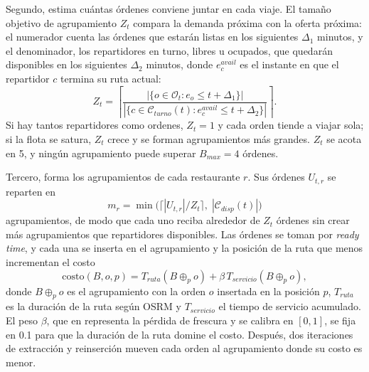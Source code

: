 \documentclass[10pt]{article}
\newcommand{\Cdisp}{\mathcal{C}_{disp}(t)}
\begin{document}
Segundo, estima cuántas órdenes conviene juntar en cada viaje. El tamaño objetivo de agrupamiento
$Z_t$ compara la demanda próxima con la oferta próxima: el numerador cuenta las órdenes que estarán
listas en los siguientes $\Delta_1$ minutos, y el denominador, los repartidores en turno, libres u
ocupados, que quedarán disponibles en los siguientes $\Delta_2$ minutos, donde $e^{avail}_c$ es el
instante en que el repartidor $c$ termina su ruta actual:
\begin{equation}
  Z_t = \left\lceil \frac{|\{o \in \mathcal{O}_t : e_o \leq t + \Delta_1\}|}
                        {|\{c \in \mathcal{C}_{turno}(t) : e^{avail}_c \leq t + \Delta_2\}|} \right\rceil.
  \label{eq:zt}
\end{equation}
Si hay tantos repartidores como ordenes, $Z_t = 1$ y cada orden tiende a viajar sola; si la flota se
satura, $Z_t$ crece y se forman agrupamientos más grandes. $Z_t$ se acota en 5, y ningún agrupamiento
puede superar $B_{max} = 4$ órdenes.

Tercero, forma los agrupamientos de cada restaurante $r$. Sus órdenes $U_{t,r}$ se reparten en
\[
  m_r = \min\bigl(\lceil |U_{t,r}|/Z_t \rceil,\; |\Cdisp|\bigr)
\]
agrupamientos, de modo que cada uno reciba alrededor de $Z_t$ órdenes sin crear más agrupamientos que
repartidores disponibles. Las órdenes se toman por \textit{ready time}, y cada una se inserta en el
agrupamiento y la posición de la ruta que menos incrementan el costo
\begin{equation}
  \text{costo}(B, o, p) = T_{ruta}(B \oplus_p o) + \beta\, T_{servicio}(B \oplus_p o),
  \label{eq:costo}
\end{equation}
donde $B \oplus_p o$ es el agrupamiento con la orden $o$ insertada en la posición $p$, $T_{ruta}$ es
la duración de la ruta según OSRM y $T_{servicio}$ el tiempo de servicio acumulado. El peso $\beta$, que en
\cite{Reyes2018} representa la pérdida de frescura y se calibra en $[0, 1]$, se fija en 0.1 para que la
duración de la ruta domine el costo. Después, dos iteraciones de extracción y reinserción mueven
cada orden al agrupamiento donde su costo es menor.
\end{document}
